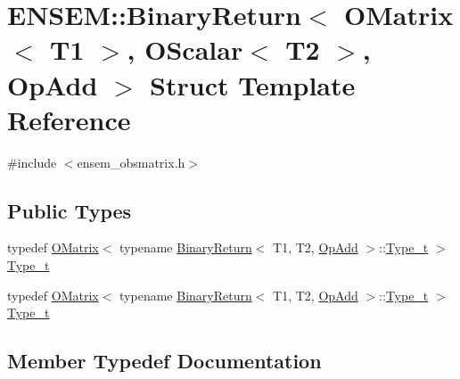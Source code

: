 \hypertarget{structENSEM_1_1BinaryReturn_3_01OMatrix_3_01T1_01_4_00_01OScalar_3_01T2_01_4_00_01OpAdd_01_4}{}\section{E\+N\+S\+EM\+:\+:Binary\+Return$<$ O\+Matrix$<$ T1 $>$, O\+Scalar$<$ T2 $>$, Op\+Add $>$ Struct Template Reference}
\label{structENSEM_1_1BinaryReturn_3_01OMatrix_3_01T1_01_4_00_01OScalar_3_01T2_01_4_00_01OpAdd_01_4}


{\ttfamily \#include $<$ensem\+\_\+obsmatrix.\+h$>$}

\subsection*{Public Types}
\begin{DoxyCompactItemize}
\item 
typedef \mbox{\hyperlink{classENSEM_1_1OMatrix}{O\+Matrix}}$<$ typename \mbox{\hyperlink{structENSEM_1_1BinaryReturn}{Binary\+Return}}$<$ T1, T2, \mbox{\hyperlink{structENSEM_1_1OpAdd}{Op\+Add}} $>$\+::\mbox{\hyperlink{structENSEM_1_1BinaryReturn_3_01OMatrix_3_01T1_01_4_00_01OScalar_3_01T2_01_4_00_01OpAdd_01_4_a01b3c8b1961280e45c4548f85bd70c7c}{Type\+\_\+t}} $>$ \mbox{\hyperlink{structENSEM_1_1BinaryReturn_3_01OMatrix_3_01T1_01_4_00_01OScalar_3_01T2_01_4_00_01OpAdd_01_4_a01b3c8b1961280e45c4548f85bd70c7c}{Type\+\_\+t}}
\item 
typedef \mbox{\hyperlink{classENSEM_1_1OMatrix}{O\+Matrix}}$<$ typename \mbox{\hyperlink{structENSEM_1_1BinaryReturn}{Binary\+Return}}$<$ T1, T2, \mbox{\hyperlink{structENSEM_1_1OpAdd}{Op\+Add}} $>$\+::\mbox{\hyperlink{structENSEM_1_1BinaryReturn_3_01OMatrix_3_01T1_01_4_00_01OScalar_3_01T2_01_4_00_01OpAdd_01_4_a01b3c8b1961280e45c4548f85bd70c7c}{Type\+\_\+t}} $>$ \mbox{\hyperlink{structENSEM_1_1BinaryReturn_3_01OMatrix_3_01T1_01_4_00_01OScalar_3_01T2_01_4_00_01OpAdd_01_4_a01b3c8b1961280e45c4548f85bd70c7c}{Type\+\_\+t}}
\end{DoxyCompactItemize}


\subsection{Member Typedef Documentation}
\mbox{\label{structENSEM_1_1BinaryReturn_3_01OMatrix_3_01T1_01_4_00_01OScalar_3_01T2_01_4_00_01OpAdd_01_4_a01b3c8b1961280e45c4548f85bd70c7c}} 

